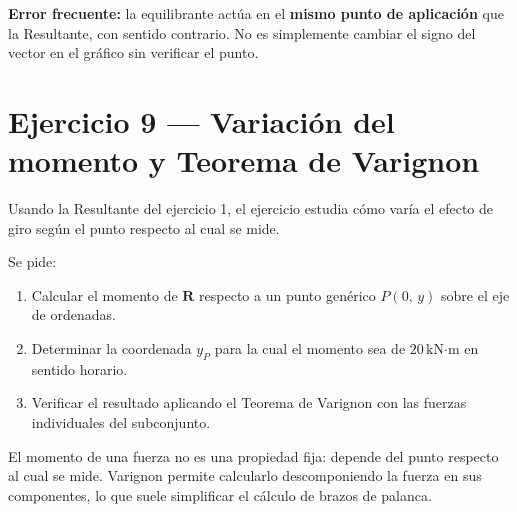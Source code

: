 \documentclass[
  spanish,
  11pt,
  a4paper,
]{article}
\providecommand{\tightlist}{%
  \setlength{\itemsep}{0pt}\setlength{\parskip}{0pt}}
\begin{document}
\begin{tcolorbox}[enhanced jigsaw, bottomrule=.15mm, bottomtitle=1mm, titlerule=0mm, leftrule=.75mm, rightrule=.15mm, title=\textcolor{quarto-callout-warning-color}{\faExclamationTriangle}\hspace{0.5em}{Advertencia}, coltitle=black, colframe=quarto-callout-warning-color-frame, left=2mm, opacitybacktitle=0.6, opacityback=0, toptitle=1mm, toprule=.15mm, colbacktitle=quarto-callout-warning-color!10!white, colback=white, breakable, arc=.35mm]

\textbf{Error frecuente:} la equilibrante actúa en el \textbf{mismo
punto de aplicación} que la Resultante, con sentido contrario. No es
simplemente cambiar el signo del vector en el gráfico sin verificar el
punto.

\end{tcolorbox}

\section{Ejercicio 9 --- Variación del momento y Teorema de
Varignon}\label{ejercicio-9-variaciuxf3n-del-momento-y-teorema-de-varignon}

Usando la Resultante del ejercicio 1, el ejercicio estudia cómo varía el
efecto de giro según el punto respecto al cual se mide.

Se pide:

\begin{enumerate}
\def\labelenumi{\alph{enumi})}
\tightlist
\item
  Calcular el momento de \(\mathbf{R}\) respecto a un punto genérico
  \(P(0,\,y)\) sobre el eje de ordenadas.
\item
  Determinar la coordenada \(y_P\) para la cual el momento sea de
  \(20\,\text{kN·m}\) en sentido horario.
\item
  Verificar el resultado aplicando el Teorema de Varignon con las
  fuerzas individuales del subconjunto.
\end{enumerate}

\begin{tcolorbox}[enhanced jigsaw, bottomrule=.15mm, bottomtitle=1mm, titlerule=0mm, leftrule=.75mm, rightrule=.15mm, title=\textcolor{quarto-callout-note-color}{\faInfo}\hspace{0.5em}{Nota}, coltitle=black, colframe=quarto-callout-note-color-frame, left=2mm, opacitybacktitle=0.6, opacityback=0, toptitle=1mm, toprule=.15mm, colbacktitle=quarto-callout-note-color!10!white, colback=white, breakable, arc=.35mm]

El momento de una fuerza no es una propiedad fija: depende del punto
respecto al cual se mide. Varignon permite calcularlo descomponiendo la
fuerza en sus componentes, lo que suele simplificar el cálculo de brazos
de palanca.

\end{tcolorbox}
\end{document}
